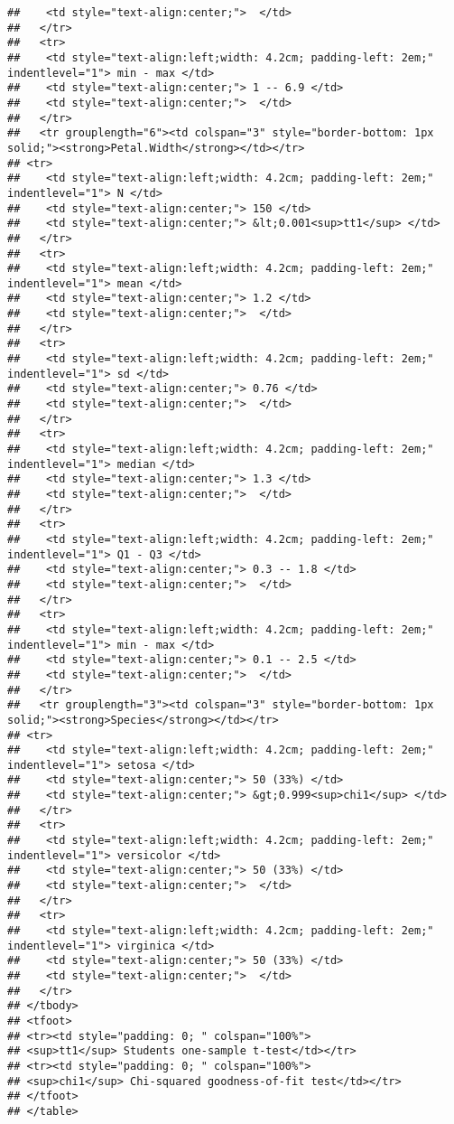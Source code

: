 \documentclass[
]{article}
\begin{document}
\begin{verbatim}
##    <td style="text-align:center;">  </td>
##   </tr>
##   <tr>
##    <td style="text-align:left;width: 4.2cm; padding-left: 2em;" indentlevel="1"> min - max </td>
##    <td style="text-align:center;"> 1 -- 6.9 </td>
##    <td style="text-align:center;">  </td>
##   </tr>
##   <tr grouplength="6"><td colspan="3" style="border-bottom: 1px solid;"><strong>Petal.Width</strong></td></tr>
## <tr>
##    <td style="text-align:left;width: 4.2cm; padding-left: 2em;" indentlevel="1"> N </td>
##    <td style="text-align:center;"> 150 </td>
##    <td style="text-align:center;"> &lt;0.001<sup>tt1</sup> </td>
##   </tr>
##   <tr>
##    <td style="text-align:left;width: 4.2cm; padding-left: 2em;" indentlevel="1"> mean </td>
##    <td style="text-align:center;"> 1.2 </td>
##    <td style="text-align:center;">  </td>
##   </tr>
##   <tr>
##    <td style="text-align:left;width: 4.2cm; padding-left: 2em;" indentlevel="1"> sd </td>
##    <td style="text-align:center;"> 0.76 </td>
##    <td style="text-align:center;">  </td>
##   </tr>
##   <tr>
##    <td style="text-align:left;width: 4.2cm; padding-left: 2em;" indentlevel="1"> median </td>
##    <td style="text-align:center;"> 1.3 </td>
##    <td style="text-align:center;">  </td>
##   </tr>
##   <tr>
##    <td style="text-align:left;width: 4.2cm; padding-left: 2em;" indentlevel="1"> Q1 - Q3 </td>
##    <td style="text-align:center;"> 0.3 -- 1.8 </td>
##    <td style="text-align:center;">  </td>
##   </tr>
##   <tr>
##    <td style="text-align:left;width: 4.2cm; padding-left: 2em;" indentlevel="1"> min - max </td>
##    <td style="text-align:center;"> 0.1 -- 2.5 </td>
##    <td style="text-align:center;">  </td>
##   </tr>
##   <tr grouplength="3"><td colspan="3" style="border-bottom: 1px solid;"><strong>Species</strong></td></tr>
## <tr>
##    <td style="text-align:left;width: 4.2cm; padding-left: 2em;" indentlevel="1"> setosa </td>
##    <td style="text-align:center;"> 50 (33%) </td>
##    <td style="text-align:center;"> &gt;0.999<sup>chi1</sup> </td>
##   </tr>
##   <tr>
##    <td style="text-align:left;width: 4.2cm; padding-left: 2em;" indentlevel="1"> versicolor </td>
##    <td style="text-align:center;"> 50 (33%) </td>
##    <td style="text-align:center;">  </td>
##   </tr>
##   <tr>
##    <td style="text-align:left;width: 4.2cm; padding-left: 2em;" indentlevel="1"> virginica </td>
##    <td style="text-align:center;"> 50 (33%) </td>
##    <td style="text-align:center;">  </td>
##   </tr>
## </tbody>
## <tfoot>
## <tr><td style="padding: 0; " colspan="100%">
## <sup>tt1</sup> Students one-sample t-test</td></tr>
## <tr><td style="padding: 0; " colspan="100%">
## <sup>chi1</sup> Chi-squared goodness-of-fit test</td></tr>
## </tfoot>
## </table>
\end{verbatim}
\end{document}
